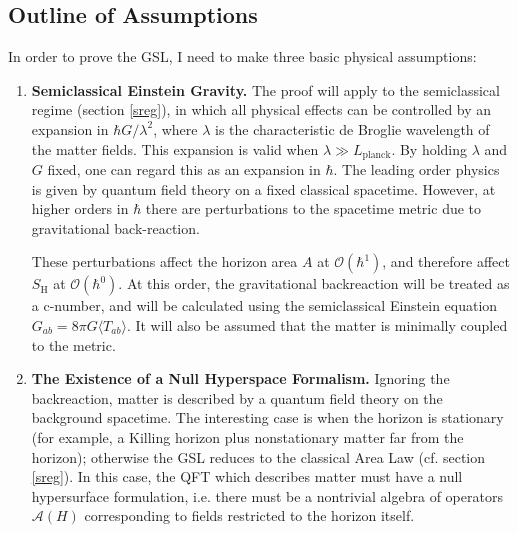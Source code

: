 \documentclass[12pt]{article}
\begin{document}
\subsection{Outline of Assumptions}\label{outline}

In order to prove the GSL, I need to make three basic physical assumptions:
\begin{enumerate}
\item \textbf{Semiclassical Einstein Gravity.}
The proof will apply to the semiclassical regime (section \ref{sreg}), in which all physical effects can be controlled by an expansion in $\hbar G / \lambda^2$, where $\lambda$ is the characteristic de Broglie wavelength of the matter fields.  This expansion is valid when $\lambda \gg L_\mathrm{planck}$.  By holding $\lambda$ and $G$ fixed, one can regard this as an expansion in $\hbar$.  The leading order physics is given by quantum field theory on a fixed classical spacetime.  However, at higher orders in $\hbar$ there are perturbations to the spacetime metric due to gravitational back-reaction.

These perturbations affect the horizon area $A$ at $\mathcal{O}(\hbar^1)$, and therefore affect $S_\mathrm{H}$ at $\mathcal{O}(\hbar^0)$.  At this order, the gravitational backreaction will be treated as a c-number, and will be calculated using the semiclassical Einstein equation $G_{ab} = 8\pi G \langle T_{ab} \rangle$.  It will also be assumed that the matter is minimally coupled to the metric.

\item \textbf{The Existence of a Null Hyperspace Formalism.}
Ignoring the backreaction, matter is described by a quantum field theory on the background spacetime.  The interesting case is when the horizon is stationary (for example, a Killing horizon plus nonstationary matter far from the horizon); otherwise the GSL reduces to the classical Area Law (cf. section \ref{sreg}).  In this case, the QFT which describes matter must have a null hypersurface formulation, i.e. there must be a nontrivial algebra of operators $\mathcal{A}(H)$ corresponding to fields restricted to the horizon itself.


\end{enumerate}
\end{document}
